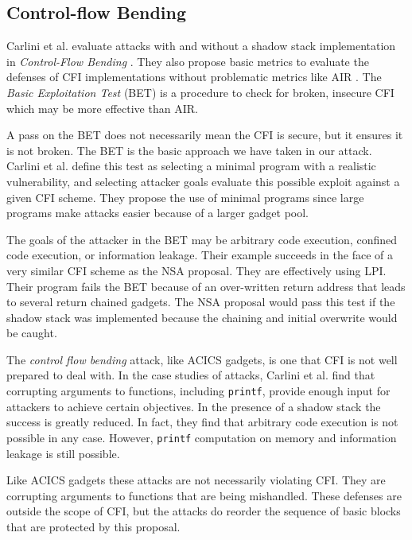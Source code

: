 \documentclass[conference,compsoc]{IEEEtran}
\begin{document}
\subsection{Control-flow Bending} \label{sec:Control-FlowBending}

Carlini et al. evaluate attacks with and without a shadow stack implementation in \emph{Control-Flow Bending} \cite{carlini}. They also propose basic metrics to evaluate the defenses of CFI implementations\cite{carlini} without problematic metrics like AIR \cite{Zhang:2013:COTS}. The \emph{Basic Exploitation Test} (BET) is a procedure to check for broken, insecure CFI which may be more effective than AIR.

A pass on the BET does not necessarily mean the CFI is secure, but it ensures it is not broken. The BET is the basic approach we have taken in our attack. Carlini et al. define this test as selecting a minimal program with a realistic vulnerability, and selecting attacker goals evaluate this possible exploit against a given CFI scheme. They propose the use of minimal programs since large programs make attacks easier because of a larger gadget pool.

The goals of the attacker in the BET may be arbitrary code execution, confined code execution, or information leakage\cite{carlini}. Their example succeeds in the face of a very similar CFI scheme as the NSA proposal. They are effectively using LPI. Their program fails the BET because of an over-written return address that leads to several return chained gadgets. The NSA proposal would pass this test if the shadow stack was implemented because the chaining and initial overwrite would be caught.

The \emph{control flow bending} attack, like ACICS gadgets, is one that CFI is not well prepared to deal with. In the case studies of attacks, Carlini et al. find that corrupting arguments to functions, including \texttt{printf}, provide enough input for attackers to achieve certain objectives. In the presence of a shadow stack the success is greatly reduced. In fact, they find that arbitrary code execution is not possible in any case. However, \texttt{printf} computation on memory and information leakage is still possible\cite{carlini}.

Like ACICS gadgets these attacks are not necessarily violating CFI. They are corrupting arguments to functions that are being mishandled. These defenses are outside the scope of CFI, but the attacks do reorder the sequence of basic blocks that are protected by this proposal. 
\end{document}
